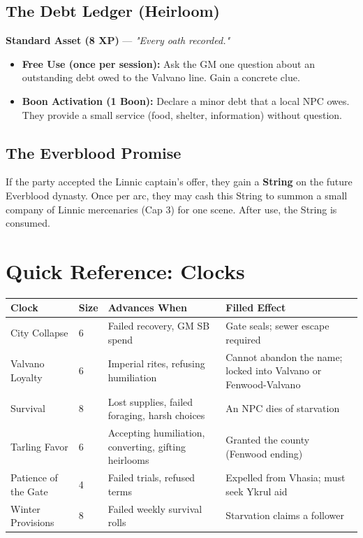 \documentclass[11pt]{book}
\begin{document}
\section*{The Debt Ledger (Heirloom)}
\textbf{Standard Asset (8 XP)} --- \textit{"Every oath recorded."}
\begin{itemize}
    \item \textbf{Free Use (once per session):} Ask the GM one question about an outstanding debt owed to the Valvano line. Gain a concrete clue.
    \item \textbf{Boon Activation (1 Boon):} Declare a minor debt that a local NPC owes. They provide a small service (food, shelter, information) without question.
\end{itemize}

\section*{The Everblood Promise}
If the party accepted the Linnic captain's offer, they gain a \textbf{String} on the future Everblood dynasty. Once per arc, they may cash this String to summon a small company of Linnic mercenaries (Cap 3) for one scene. After use, the String is consumed.

\clearpage

\chapter*{Quick Reference: Clocks}

\begin{tabular}{|l|l|l|l|}
\hline
Clock & Size & Advances When & Filled Effect \\
\hline
City Collapse & 6 & Failed recovery, GM SB spend & Gate seals; sewer escape required \\
\hline
Valvano Loyalty & 6 & Imperial rites, refusing humiliation & Cannot abandon the name; locked into Valvano or Fenwood-Valvano \\
\hline
Survival & 8 & Lost supplies, failed foraging, harsh choices & An NPC dies of starvation \\
\hline
Tarling Favor & 6 & Accepting humiliation, converting, gifting heirlooms & Granted the county (Fenwood ending) \\
\hline
Patience of the Gate & 4 & Failed trials, refused terms & Expelled from Vhasia; must seek Ykrul aid \\
\hline
Winter Provisions & 8 & Failed weekly survival rolls & Starvation claims a follower \\
\hline
\end{tabular}
\end{document}
